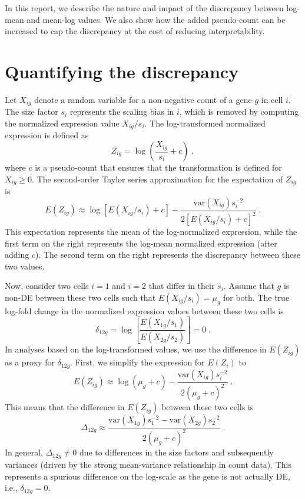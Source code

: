 \documentclass[10pt,letterpaper]{article}
\begin{document}
In this report, we describe the nature and impact of the discrepancy between log-mean and mean-log values.
We also show how the added pseudo-count can be increased to cap the discrepancy at the cost of reducing interpretability.

\section{Quantifying the discrepancy}
Let $X_{ig}$ denote a random variable for a non-negative count of a gene $g$ in cell $i$.
The size factor $s_i$ represents the scaling bias in $i$, which is removed by computing the normalized expression value $X_{ig}/s_i$.
The log-transformed normalized expression is defined as 
\[
Z_{ig} = \log\left(\frac{X_{ig}}{s_i}+ c\right) \;,
\]
where $c$ is a pseudo-count that ensures that the transformation is defined for $X_{ig} \ge 0$.
The second-order Taylor series approximation for the expectation of $Z_{ig}$ is
\[
E(Z_{ig}) \approx \log[E(X_{ig}/s_i) + c] - \frac{\mbox{var}(X_{ig})s_i^{-2}}{2[E(X_{ig}/s_i) + c]^2} \;.
\]
This expectation represents the mean of the log-normalized expression, while the first term on the right represents the log-mean normalized expression (after adding $c$). 
The second term on the right represents the discrepancy between these two values.

Now, consider two cells $i=1$ and $i=2$ that differ in their $s_i$.
Assume that $g$ is non-DE between these two cells such that $E(X_{ig}/s_i)=\mu_g$ for both.
The true log-fold change in the normalized expression values between these two cells is
\[
\delta_{12g} = \log\left[ \frac{E(X_{1g}/s_1)}{E(X_{2g}/s_2)} \right] = 0 \;.
\]
In analyses based on the log-transformed values, we use the difference in $E(Z_{ig})$ as a proxy for $\delta_{12g}$.
First, we simplify the expression for $E(Z_i)$ to
\[
E(Z_{ig}) \approx \log(\mu_g + c) - \frac{\mbox{var}(X_{ig})s_i^{-2}}{2(\mu_g + c)^2} \;.
\]
This means that the difference in $E(Z_{ig})$ between these two cells is 
\begin{equation}
\Delta_{12g} \approx \frac{\mbox{var}(X_{1g})s_1^{-2} -  \mbox{var}(X_{2g})s_2^{-2}}{2(\mu_g + c)^2} \;. \label{eqn:spuriousdiff}
\end{equation}
In general, $\Delta_{12g} \neq 0$ due to differences in the size factors and subsequently variances (driven by the strong mean-variance relationship in count data).
This represents a spurious difference on the log-scale as the gene is not actually DE, i.e., $\delta_{12g}=0$.
\end{document}
